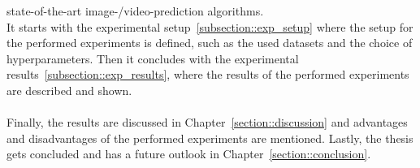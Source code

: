  state-of-the-art image-/video-prediction algorithms.\\
 It starts with the experimental setup~\ref{subsection::exp_setup}
 where the setup for the performed experiments is defined, such as the used datasets and the choice of hyperparameters. Then it concludes with the
 experimental results~\ref{subsection::exp_results}, where the results of the performed experiments are described and shown.
 \\\\
 Finally, the results are discussed in Chapter~\ref{section::discussion} and advantages and disadvantages of the performed experiments are mentioned.
 Lastly, the thesis gets concluded and has a future outlook in Chapter~\ref{section::conclusion}.